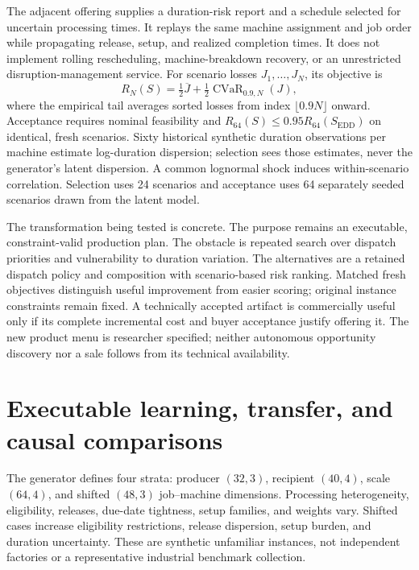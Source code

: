 The adjacent offering supplies a duration-risk report and a schedule selected for uncertain processing times. It replays the same machine assignment and job order while propagating release, setup, and realized completion times. It does not implement rolling rescheduling, machine-breakdown recovery, or an unrestricted disruption-management service. For scenario losses $J_1,\ldots,J_N$, its objective is
\begin{equation}
 R_N(S)=\tfrac12\overline{J}+\tfrac12\operatorname{CVaR}_{0.9,N}(J),
 \label{eq:risk-objective}
\end{equation}
where the empirical tail averages sorted losses from index $\lfloor0.9N\rfloor$ onward. Acceptance requires nominal feasibility and $R_{64}(S)\leq0.95R_{64}(S_{\mathrm{EDD}})$ on identical, fresh scenarios. Sixty historical synthetic duration observations per machine estimate log-duration dispersion; selection sees those estimates, never the generator's latent dispersion. A common lognormal shock induces within-scenario correlation. Selection uses 24 scenarios and acceptance uses 64 separately seeded scenarios drawn from the latent model.

The transformation being tested is concrete. The purpose remains an executable, constraint-valid production plan. The obstacle is repeated search over dispatch priorities and vulnerability to duration variation. The alternatives are a retained dispatch policy and composition with scenario-based risk ranking. Matched fresh objectives distinguish useful improvement from easier scoring; original instance constraints remain fixed. A technically accepted artifact is commercially useful only if its complete incremental cost and buyer acceptance justify offering it. The new product menu is researcher specified; neither autonomous opportunity discovery nor a sale follows from its technical availability.

\section{Executable learning, transfer, and causal comparisons}
\label{sec:methods-learning}

The generator defines four strata: producer $(32,3)$, recipient $(40,4)$, scale $(64,4)$, and shifted $(48,3)$ job--machine dimensions. Processing heterogeneity, eligibility, releases, due-date tightness, setup families, and weights vary. Shifted cases increase eligibility restrictions, release dispersion, setup burden, and duration uncertainty. These are synthetic unfamiliar instances, not independent factories or a representative industrial benchmark collection.

